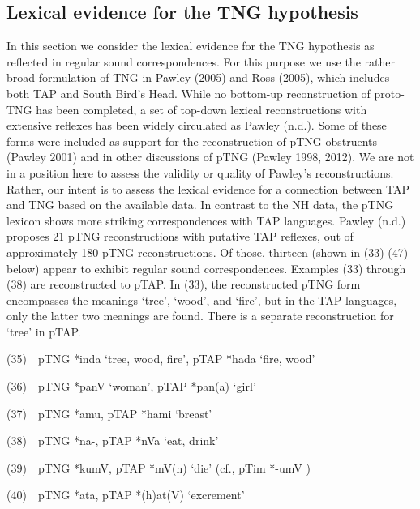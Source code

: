 \subsection[Lexical evidence for the TNG hypothesis]{Lexical evidence for the TNG hypothesis}
\hypertarget{RefHeading72078871885726}{}In this section we consider the lexical evidence for the TNG hypothesis as reflected in regular sound correspondences. For this purpose we use the rather broad formulation of TNG in Pawley (2005) and Ross (2005), which includes both TAP and South Bird{\textquoteright}s Head. While no bottom-up reconstruction of proto-TNG has been completed, a set of top-down lexical reconstructions with extensive reflexes has been widely circulated as Pawley (n.d.). Some of these forms were included as support for the reconstruction of pTNG obstruents (Pawley 2001) and in other discussions of pTNG (Pawley 1998, 2012). We are not in a position here to assess the validity or quality of Pawley{\textquoteright}s reconstructions. Rather, our intent is to assess the lexical evidence for a connection between TAP and TNG based on the available data. In contrast to the NH data, the pTNG lexicon shows more striking correspondences with TAP languages. Pawley (n.d.) proposes 21 pTNG 
reconstructions with putative TAP reflexes, out of approximately 180 pTNG reconstructions. Of those, thirteen (shown in (33)-(47) below) appear to exhibit regular sound correspondences. Examples (33) through (38) are reconstructed to pTAP. In (33), the reconstructed pTNG form encompasses the meanings {\textquoteleft}tree{\textquoteright}, {\textquoteleft}wood{\textquoteright}, and {\textquoteleft}fire{\textquoteright}, but in the TAP languages, only the latter two meanings are found. There is a separate reconstruction for {\textquoteleft}tree{\textquoteright} in pTAP. 

(35)\ \ pTNG *inda {\textquoteleft}tree, wood, fire{\textquoteright}, pTAP *hada {\textquoteleft}fire, wood{\textquoteright}

(36)\ \ pTNG *panV {\textquoteleft}woman{\textquoteright}, pTAP *pan(a) {\textquoteleft}girl{\textquoteright}

(37)\ \ pTNG *amu, pTAP *hami {\textquoteleft}breast{\textquoteright}

(38)\ \ pTNG *na-, pTAP *nVa {\textquoteleft}eat, drink{\textquoteright}

(39)\ \ pTNG *kumV, pTAP *mV(n) {\textquoteleft}die{\textquoteright} (cf., pTim *-umV )

(40)\ \ pTNG *ata, pTAP *(h)at(V) {\textquoteleft}excrement{\textquoteright}

